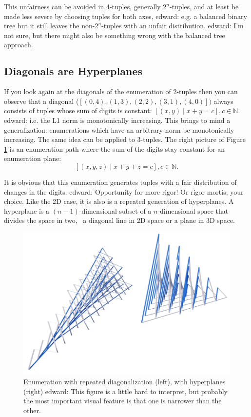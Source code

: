 \documentclass{tmr}
\newcommand{\authornote}[3]{{\color{#2} {\sc #1}: #3}}
\newcommand\bay[1]{\authornote{edward}{blue}{#1}}
\begin{document}
This unfairness can be avoided in 4-tuples, generally $2^n$-tuples, and at least be made less severe by choosing tuples for both axes, \bay{e.g. a balanced binary tree} but it still leaves the non-$2^n$-tuples with an unfair distribution.  \bay{I'm not sure, but there might also be something wrong with the balanced tree approach.}

\subsection{Diagonals are Hyperplanes}
If you look again at the diagonals of the enumeration of 2-tuples then you can observe that a diagonal (\eg $ [ (0,4), (1,3), (2,2), (3,1), (4,0) ])$ always consists of tuples whose sum of digits is constant:
$  [ (x,y)  \mid  x+y  = c ], c \in \mathbb{N}. $ \bay{i.e. the L1 norm is monotonically increasing. This brings to mind a generalization: enumerations which have an arbitrary norm be monotonically increasing.}
The same idea can be applied to 3-tuples. The right picture of Figure \ref{enum3} is an enumeration path where the sum of the digits stay constant for an enumeration plane:
\[  [ (x,y,z)  \mid  x+y+z  = c ], c \in \mathbb{N}. \]

It is obvious that this enumeration generates tuples with a fair distribution of changes in the digits. \bay{Opportunity for more rigor! Or rigor mortis; your choice.} Like the 2D case, it is also is a repeated generation of hyperplanes. A hyperplane is a $(n-1)$-dimensional subset of a $n$-dimensional space that divides the space in two, \eg\ a diagonal line in 2D space or a plane in 3D space.

\begin{figure}[htbp]
  \centering
    \includegraphics[width=\textwidth]{enumerate2.png}
    \caption{Enumeration with repeated diagonalization (left), with hyperplanes (right) \bay{This figure is a little hard to interpret, but probably the most important visual feature is that one is narrower than the other.}}
  \label{enum3}
\end{figure}
\end{document}
